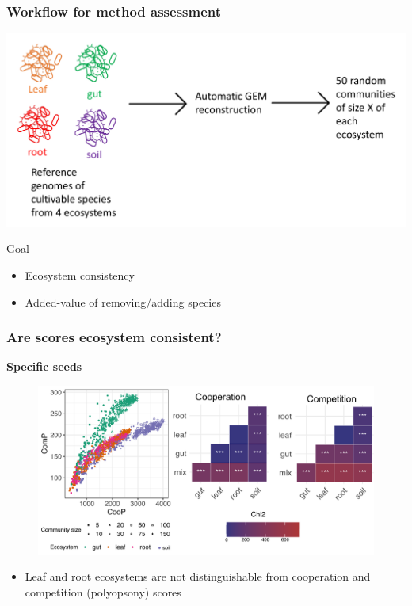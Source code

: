 \documentclass[8pt,usenames,dvipsnames]{beamer}
\begin{document}
\begin{frame}
\frametitle{Workflow for method assessment}

\includegraphics[width=\textwidth]{figures/workflow-ccmc.pdf}

\begin{block}{Goal}
\begin{itemize}
\item Ecosystem consistency
\item Added-value of removing/adding species
\end{itemize}
\end{block}

\end{frame}


\begin{frame}
\frametitle{Are scores ecosystem consistent?}
\textbf{Specific seeds}
\begin{figure}
\includegraphics[width=\textwidth]{figures/coop-comp-ecosys-specific.pdf}
\end{figure}
\begin{alertblock}{}
\begin{itemize}
\item Leaf and root ecosystems are not distinguishable from cooperation and competition (polyopsony) scores
\end{itemize}
\end{alertblock}
\end{frame}
\end{document}
